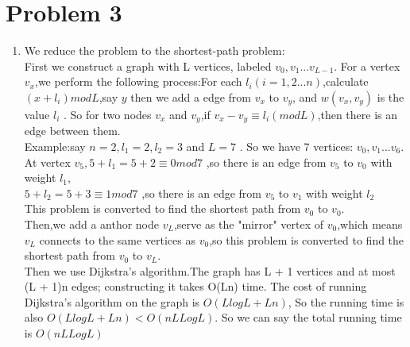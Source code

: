 \documentclass[paper=a4, fontsize=11pt]{scrartcl} %
\numberwithin{equation}{section} %
\numberwithin{figure}{section} %
\numberwithin{table}{section} %
\begin{document}
\section*{Problem 3}
\begin{enumerate}[label={3.\arabic*}]
  \item 
We reduce the problem to the shortest-path problem:\\
First we construct a graph with  L vertices, labeled ${v_0,v_1...v_{L-1}}$.
For a vertex ${v_x}$,we perform the following process:For  each ${l_i (i=1,2...n)}$,calculate ${(x+l_i) mod L }$,say ${y}$
then we add a edge from ${v_x }$ to ${v_y}$, and ${ w(v_x, v_y) }$ is the value ${ l_i }$ .
So for two nodes ${v_x}$ and ${v_y}$,if ${v_x-v_y \equiv l_i (mod L) }$,then there is an edge  between them. \\
Example:say  ${ n=2,l_1=2,l_2=3  }$ and ${ L=7}$ . So  we  have  7  vertices: ${  v_0,v_1...v_6}$. \\
At vertex  ${  v_5,5+l_1=5+2 \equiv 0  mod 7 }$ ,so there is an edge from ${v_5}$ to ${ v_0}$ with weight ${ l_1 }$,\\
${ 5+l_2=5+3 \equiv 1 mod 7 }$ ,so there is an edge from ${v_5}$  to ${ v_1}$ with weight  ${ l_2 }$\\
This problem is converted to find the shortest path from ${v_0 }$  to  ${v_0 }$.\\
Then,we add a anthor node ${v_L}$,serve as the "mirror" vertex  of ${v_0}$,which means ${v_L}$ connects to the same vertices
as ${v_0}$,so this problem is converted to find the shortest path from ${v_0 }$  to  ${v_L}$.\\
Then we use Dijkstra's algorithm.The graph has L + 1 vertices and at most (L + 1)n edges; constructing it takes O(Ln) time. The cost of running Dijkstra's algorithm on the graph is ${O(L log L + Ln)}$, So the running time is also ${O(L log L + Ln) < O(nLLogL)}$. So we can say the total running time is ${O(nLLogL)}$

\end{enumerate}

\end{document}
